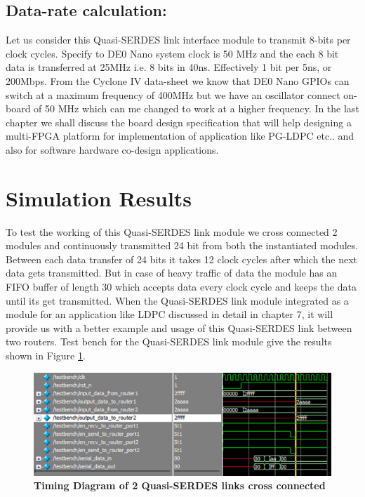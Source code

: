 \subsection{Data-rate calculation:}
Let us consider this Quasi-SERDES link interface module to transmit 8-bits per clock cycles. Specify to DE0 Nano system clock is 50 MHz and the each 8 bit data is transferred at 25MHz i.e. 8 bits in 40ns. Effectively 1 bit per 5ns, or 200Mbps. From the Cyclone IV data-sheet \cite{DE0Nanodatasheet} we know that DE0 Nano GPIOs can switch at a maximum frequency of 400MHz but we have an oscillator connect on-board of 50 MHz which can me changed to work at a higher frequency. In the last chapter we shall discuss the board design specification that will help designing a multi-FPGA platform for implementation of application like PG-LDPC etc.. and also for software hardware co-design applications.

\section{Simulation Results}

To test the working of this Quasi-SERDES link module we cross connected 2 modules and continuously transmitted 24 bit from both the instantiated modules. Between each data transfer of 24 bits it takes 12 clock cycles after which the next data gets transmitted. But in case of heavy traffic of data the module has an FIFO buffer of length 30 which accepts data every clock cycle and keeps the data until its get transmitted. When the Quasi-SERDES link module integrated as a module for an application like LDPC discussed in detail in chapter 7, it will provide us with a better example and usage of this Quasi-SERDES link between two routers. Test bench for the Quasi-SERDES link module give the results shown in Figure \ref{Quasi-SERDESLinkTiming}.

\begin{figure}[H]
  \centering
   \includegraphics[scale=1]{./figs/phyTiming}
  \caption{\textbf{Timing Diagram of 2 Quasi-SERDES links cross connected}}
  \label{Quasi-SERDESLinkTiming}
\end{figure}

